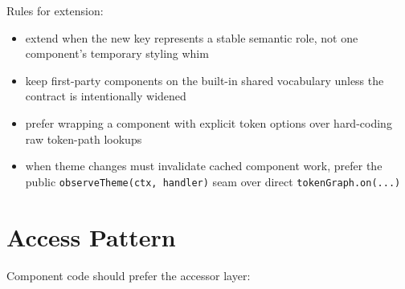 Rules for extension:

\begin{itemize}
\tightlist
\item
  extend when the new key represents a stable semantic role, not one component's temporary styling whim
\item
  keep first-party components on the built-in shared vocabulary unless the contract is intentionally widened
\item
  prefer wrapping a component with explicit token options over hard-coding raw token-path lookups
\item
  when theme changes must invalidate cached component work, prefer the public \texttt{o\allowbreak{}b\allowbreak{}s\allowbreak{}e\allowbreak{}r\allowbreak{}v\allowbreak{}e\allowbreak{}T\allowbreak{}h\allowbreak{}e\allowbreak{}m\allowbreak{}e\allowbreak{}(\allowbreak{}c\allowbreak{}t\allowbreak{}x\allowbreak{},\allowbreak{} \allowbreak{}h\allowbreak{}a\allowbreak{}n\allowbreak{}d\allowbreak{}l\allowbreak{}e\allowbreak{}r\allowbreak{})} seam over direct \texttt{t\allowbreak{}o\allowbreak{}k\allowbreak{}e\allowbreak{}n\allowbreak{}G\allowbreak{}r\allowbreak{}a\allowbreak{}p\allowbreak{}h\allowbreak{}.\allowbreak{}o\allowbreak{}n\allowbreak{}(\allowbreak{}.\allowbreak{}.\allowbreak{}.\allowbreak{})}
\end{itemize}

\section{Access Pattern}\label{record-028-access-pattern}

Component code should prefer the accessor layer:

